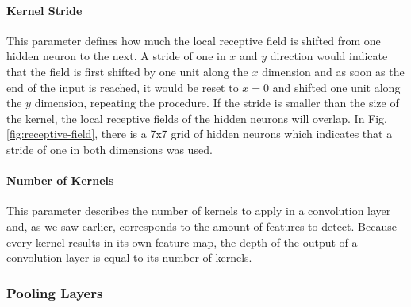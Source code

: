 \paragraph{Kernel Stride}

This parameter defines how much the local receptive field is shifted
from one hidden neuron to the next. A stride of one in \(x\) and \(y\)
direction would indicate that the field is first shifted by one unit
along the \(x\) dimension and as soon as the end of the input is
reached, it would be reset to \(x=0\) and shifted one unit along the
\(y\) dimension, repeating the procedure. If the stride is smaller
than the size of the
kernel, the local receptive fields of the hidden neurons will overlap.
In Fig. \ref{fig:receptive-field}, there is a 7x7 grid of hidden
neurons which indicates that a stride of one in both dimensions was
used.

\paragraph{Number of Kernels}

This parameter describes the number of kernels to apply in a
convolution layer and, as we saw earlier, corresponds to the amount of
features to detect. Because every kernel results in its own feature
map, the depth of the output of a convolution layer is equal to its
number of kernels.

\subsubsection{Pooling Layers}
\label{sec:pooling}

